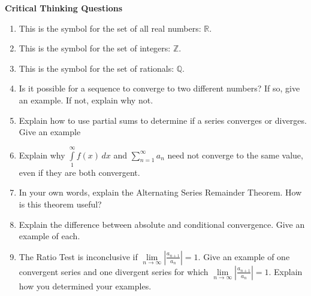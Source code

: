 \documentclass[11pt, letterpaper]{article}
\begin{document}
 
\textbf{Critical Thinking Questions}
\begin{enumerate}
\item This is the symbol for the set of all real numbers: $\mathbb{R}$. %
\item This is the symbol for the set of integers: $\mathbb{Z}$. %
\item This is the symbol for the set of rationals: $\mathbb{Q}$. %
\item Is it possible for a sequence to converge to two different numbers? If so, give an example. If not, explain why not.
\item Explain how to use partial sums to determine if a series converges or diverges. Give an example
\item Explain why $\int\limits_{1}^{\infty} f(x)\,dx$ and $\sum\limits_{n=1}^{\infty} a_n$ need not converge to the same value, even if they are both convergent.
\item  In your own words, explain the Alternating Series Remainder Theorem. How is this theorem useful?
\item Explain the difference between absolute and conditional convergence. Give an example of each.
\item The Ratio Test is inconclusive if $\displaystyle{\lim\limits_{n \to \infty} \left| \frac{a_{n+1}}{a_n} \right| =1}$. Give an example of one convergent series and one divergent series for which $\displaystyle{\lim\limits_{n \to \infty} \left| \frac{a_{n+1}}{a_n} \right| =1}$. Explain how you determined your examples.
\end{enumerate}
\end{document}
